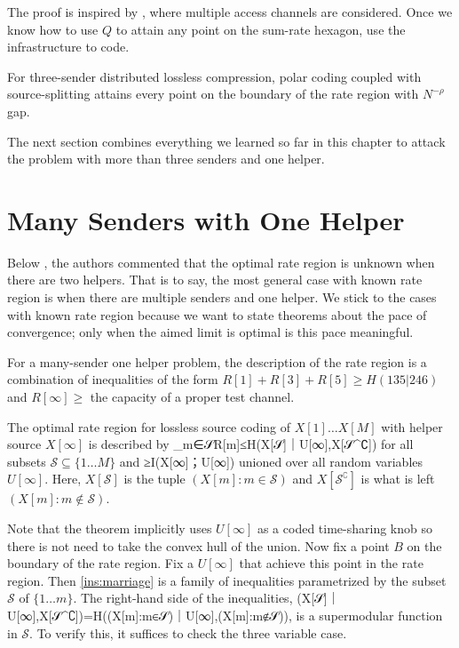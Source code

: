 \documentclass[openany]{amsbook}
\makeatletter
\numberwithin{equation}{chapter}
\numberwithin{figure}{chapter}
\numberwithin{table}{chapter}
\def\bigl@C#1{\bigl#1}					\def\bigr@C#1{\bigr#1}
\def\({\bigl@C(}	\def\){\bigr@C)}	令（{\Bigl(}			令）{\Bigr)}
\def\[#1\]{\begin{equation*}{#1}\end{equation*}}
\theoremstyle{definition}	理dfn:Definition~?s			理exa:Example~?s
\theoremstyle{remark}		理cla:Claim~?s				理rem:Remark~?s
\makeatother
\begin{document}
	The proof is inspired by \cite{GRUW01},
	where multiple access channels are considered.
	Once we know how to use $Q$ to attain any point on the sum-rate hexagon,
	use the infrastructure to code.
	
	\begin{cor}
		For three-sender distributed lossless compression,
		polar coding coupled with source-splitting attains every point
		on the boundary of the rate region with $N^{-ρ}$ gap.
	\end{cor}
	
	The next section combines everything we learned so far in this chapter
	to attack the problem with more than three senders and one helper.

\section{Many Senders with One Helper}

	Below \cite[Theorem~10.4]{EK11}, the authors commented that
	the optimal rate region is unknown when there are two helpers.
	That is to say, the most general case with known rate region
	is when there are multiple senders and one helper.
	We stick to the cases with known rate region because
	we want to state theorems about the pace of convergence;
	only when the aimed limit is optimal is this pace meaningful.
	
	For a many-sender one helper problem, the description of the rate region
	is a combination of inequalities of the form $R[1]+R[3]+R[5]≥H(135|246)$
	and $R[∞]≥$ the capacity of a proper test channel.
	
	\begin{thm}
		The optimal rate region for lossless source coding of
		$X[1]…X[M]$ with helper source $X[∞]$ is described by
		\[∑_{m∈𝒮}R[m]≤H(X[𝒮]｜U[∞],X[𝒮^∁])\label{ins:marriage}\]
		for all subsets $𝒮⊆\{1…M\}$ and
		\[R[∞]≥I(X[∞]；U[∞])\]
		unioned over all random variables $U[∞]$.
		Here, $X[𝒮]$ is the tuple $(X[m]:m∈𝒮)$ and
		$X[𝒮^∁]$ is what is left $(X[m]:m∉𝒮)$.
	\end{thm}
	
	Note that the theorem implicitly uses $U[∞]$ as a coded time-sharing knob
	so there is not need to take the convex hull of the union.
	Now fix a point $B$ on the boundary of the rate region.
	Fix a $U[∞]$ that achieve this point in the rate region.
	Then \cref{ins:marriage} is a family of inequalities
	parametrized by the subset $𝒮$ of $\{1…m\}$.
	The right-hand side of the inequalities,
	\[H(X[𝒮]｜U[∞],X[𝒮^∁])=H\((X[m]:m∈𝒮)｜U[∞],(X[m]:m∉𝒮)\),\]
	is a supermodular function in $𝒮$.
	To verify this, it suffices to check the three variable case.
	
\end{document}
